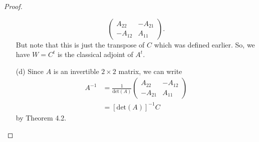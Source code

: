 \begin{proof}
\begin{enumerate}
\[\begin{pmatrix}
            {A}_{22} &  - {A}_{21} \\
            - {A}_{12} & {A}_{11}
        \end{pmatrix}. \]
        But note that this is just the transpose of \( C  \) which was defined earlier. So, we have \( W = C^{t} \) is the classical adjoint of \( A^{t} \). 
    \item[(d)] Since \( A \) is an invertible \( 2 \times 2 \) matrix, we can write
        \begin{align*}
            A^{-1} &= \frac{ 1 }{ \text{det}(A) } \begin{pmatrix}
                {A}_{22} & - {A}_{12} \\
                -{A}_{21} & {A}_{11}
            \end{pmatrix} \\
                   &= [\text{det}(A)]^{-1} C 
        \end{align*}
        by Theorem 4.2.
\end{enumerate}
\end{proof}

